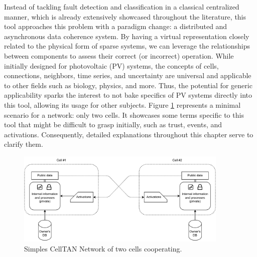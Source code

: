 Instead of tackling fault detection and classification in a classical centralized manner, which is already extensively showcased throughout the literature, this tool approaches this problem with a paradigm change: a distributed and asynchronous data coherence system. By having a virtual representation closely related to the physical form of sparse systems, we can leverage the relationships between components to assess their correct (or incorrect) operation. While initially designed for photovoltaic (PV) systems, the concepts of cells, connections, neighbors, time series, and uncertainty are universal and applicable to other fields such as biology, physics, and more. Thus, the potential for generic applicability sparks the interest to not bake specifics of PV systems directly into this tool, allowing its usage for other subjects. Figure \ref{fig:celltanintro} represents a minimal scenario for a network: only two cells. It showcases some terms specific to this tool that might be difficult to grasp initially, such as trust, events, and activations. Consequently, detailed explanations throughout this chapter serve to clarify them.

\begin{figure}[h!]
    \centering
    \includegraphics[width=0.9\textwidth]{figures/chapter4/cell/intro.pdf}
    \caption{Simples CellTAN Network of two cells cooperating.}
    \label{fig:celltanintro}
\end{figure}

